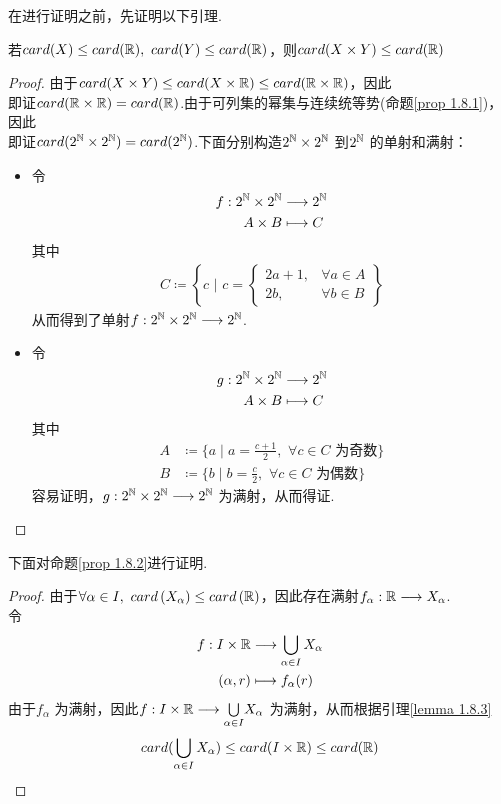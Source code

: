 	在进行证明之前，先证明以下引理.
	\begin{lemma}\label{lemma 1.8.3}
		若$card(X) \leq card(\mathbb{R}) , \,\, card(Y) \leq card(\mathbb{R})$，则$card(X \times Y) \leq card(\mathbb{R})$
	\end{lemma}
	\begin{proof}
		由于$card(X \times Y) \leq card(X \times \mathbb{R}) \leq card(\mathbb{R} \times \mathbb{R})$，因此\\
		即证$card(\mathbb{R} \times \mathbb{R}) = card(\mathbb{R})$.由于可列集的幂集与连续统等势(命题\ref{prop 1.8.1})，因此\\
		即证$card(2^{\mathbb{N}} \times 2^{\mathbb{N}}) = card(2^{\mathbb{N}})$.下面分别构造$2^{\mathbb{N}} \times 2^{\mathbb{N}}$ 到$2^{\mathbb{N}}$ 的单射和满射：
		\begin{itemize}
			\item 令
			\begin{align}
				f : 2^{\mathbb{N}} \times 2^{\mathbb{N}} &\longrightarrow 2^{\mathbb{N}} \\
				A \times B &\longmapsto C
			\end{align}
			其中
			\begin{align}
				C \coloneqq \left\{ c \,\, \Big| \,\, c = 
				\begin{cases}
					2a+1,&\forall a\in A\\
					2b,&\forall b\in B
				\end{cases} \right\}
			\end{align}
			从而得到了单射$f : 2^{\mathbb{N}} \times 2^{\mathbb{N}} \longrightarrow 2^{\mathbb{N}}$.
			
			\item 令
			\begin{align}
				g : 2^{\mathbb{N}} \times 2^{\mathbb{N}} &\longrightarrow 2^{\mathbb{N}} \\
				A \times B &\longmapsto C
			\end{align}
			其中
			\begin{align}
				A &\coloneqq \{ a \mid a = \frac{c + 1}{2} , \,\, \forall c \in C \,\, \text{为奇数} \} \\
				B &\coloneqq \{ b \mid b = \frac{c}{2} , \,\, \forall c \in C \,\, \text{为偶数} \}
			\end{align}
			容易证明，$g : 2^{\mathbb{N}} \times 2^{\mathbb{N}} \longrightarrow 2^{\mathbb{N}}$ 为满射，从而得证.
		\end{itemize}
	\end{proof}

	下面对命题\ref{prop 1.8.2}进行证明.
	\begin{proof}
		由于$\forall \alpha \in I , \,\, card\left( X_{\alpha} \right) \leq card\left( \mathbb{R} \right)$，因此存在满射$f_\alpha : \mathbb{R} \longrightarrow X_\alpha$.\\
		令
		\begin{align}
			f : I \times \mathbb{R} &\longrightarrow \bigcup_{\alpha \in I}{X_\alpha} \\
			(\alpha , r) &\longmapsto f_{\alpha}(r)
		\end{align}
		由于$f_\alpha$ 为满射，因此$f : I \times \mathbb{R} \longrightarrow \underset{\alpha \in I}{\bigcup}{X_\alpha}$ 为满射，从而根据引理\ref{lemma 1.8.3}
		\begin{align}
			card(\bigcup_{\alpha \in I}{X_\alpha}) \leq card(I \times \mathbb{R}) \leq card(\mathbb{R})
		\end{align}
	\end{proof}
	
